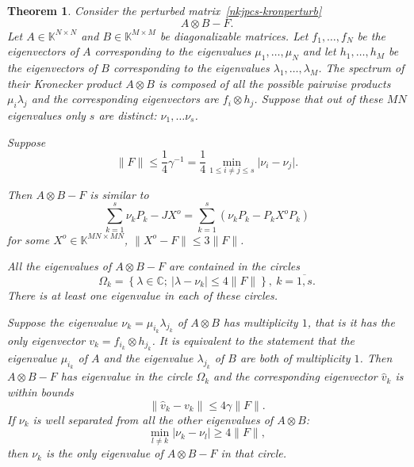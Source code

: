 \documentclass[a4paper]{jpconf}
\newtheorem{nkjpcsthm}{Theorem}
\begin{document}
\begin{nkjpcsthm}
    Consider the perturbed matrix~\eqref{nkjpcs-kronperturb}
        \[
            A{\otimes}B - F.
        \]
    Let \( A\in\mathbb{K}^{N{\times}N} \) and \( B\in\mathbb{K}^{M{\times}M} \)
        be diagonalizable matrices.
    Let \( f_1, \ldots, f_N \) be the eigenvectors of \( A \)
        corresponding to the eigenvalues \( \mu_1, \ldots, \mu_N \)
        and let \( h_1, \ldots, h_M \) be the eigenvectors of \( B \)
        corresponding to the eigenvalues \( \lambda_1, \ldots, \lambda_M \).
    The spectrum of their Kronecker product \( A{\otimes}B \)
        is composed of all the possible pairwise products \( \mu_i \lambda_j \)
        and the corresponding eigenvectors are \( f_i\otimes h_j \).
    Suppose that out of these \( MN \) eigenvalues only \( s \) are distinct:
        \( \nu_1, \ldots \nu_s \).

    Suppose
    \[
        \|F\| \leq \frac14 \gamma^{-1} = \frac14 \min_{1\leq i{\neq}j\leq s}\lvert\nu_i - \nu_j\rvert.
    \]

    Then \( A{\otimes}B - F \) is similar to
    \[ \sum_{k=1}^s \nu_k P_k - JX^o = \sum_{k=1}^s (\nu_k P_k - P_k X^o P_k) \]
    for some \( X^o \in \mathbb{K}^{MN{\times}MN} \),
    \( \|X^o - F\|\leq 3\|F\| \).

    All the eigenvalues of \( A{\otimes}B - F \) are contained in the circles
    \[
        \Omega_k = \left\{
            \lambda\in\mathbb{C};
            \ \lvert\lambda - \nu_k\rvert \leq 4\|F\|
            \right\},
        \ k{=}\overline{1,s}.
    \]
    There is at least one eigenvalue in each of these circles.

    Suppose the eigenvalue \( \nu_k=\mu_{i_k}\lambda_{j_k} \) of \( A{\otimes}B \) has multiplicity \( 1 \),
        that is it has the only eigenvector \( v_k = f_{i_k}{\otimes}h_{j_k} \).
    It is equivalent to the statement that the eigenvalue \( \mu_{i_k} \)
        of \( A \) and the eigenvalue \( \lambda_{j_k} \) of \( B \)
        are both of multiplicity \( 1 \).
    Then \( A{\otimes}B - F \) has eigenvalue in the circle \( \Omega_k \)
        and the corresponding eigenvector \( \hat{v}_k \) is within bounds
    \[
        \|\hat{v}_k - v_k\| \leq 4\gamma \|F\|.
    \]
    If \( \nu_k \) is well separated from all the other eigenvalues of \( A{\otimes}B \):
    \[
        \min_{l\neq k}
        \lvert
        \nu_k - \nu_l
        \rvert
        \geq 4\|F\|,
    \]
    then \( \nu_k \) is the only eigenvalue of \( A{\otimes}B - F \)
    in that circle.
\end{nkjpcsthm}
\end{document}
